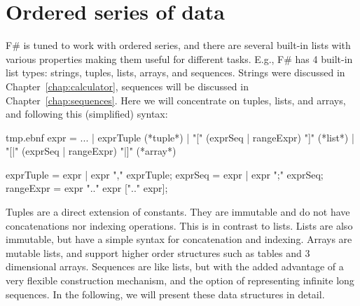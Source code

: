\chapter{Ordered series of data}
\label{chap:lists}
F\# is tuned to work with ordered series, and there are several built-in lists with various properties making them useful for different tasks. E.g.,
%
%
F\# has 4 built-in list types: strings, tuples, lists, arrays, and sequences. Strings were discussed in Chapter~\ref{chap:calculator}, sequences will be discussed in Chapter~\ref{chap:sequences}. Here we will concentrate on tuples, lists,  and arrays, and following this (simplified) syntax:
%
\begin{verbatimwrite}{tmp.ebnf}
expr = ... 
  | exprTuple (*tuple*)
  | "[" (exprSeq | rangeExpr) "]" (*list*)
  | "[|" (exprSeq | rangeExpr) "|]" (*array*)

exprTuple = expr | expr "," exprTuple;
exprSeq =  expr | expr ";" exprSeq;
rangeExpr = expr ".." expr [".." expr];
\end{verbatimwrite}
%
 Tuples are a direct extension of constants. They are immutable and do not have concatenations nor indexing operations. This is in contrast to lists. Lists are also immutable, but have a simple syntax for concatenation and indexing. Arrays are mutable lists, and support higher order structures such as tables and 3 dimensional arrays. Sequences are like lists, but with the added advantage of a very flexible construction mechanism, and the option of representing infinite long sequences. In the following, we will present these data structures in detail.

